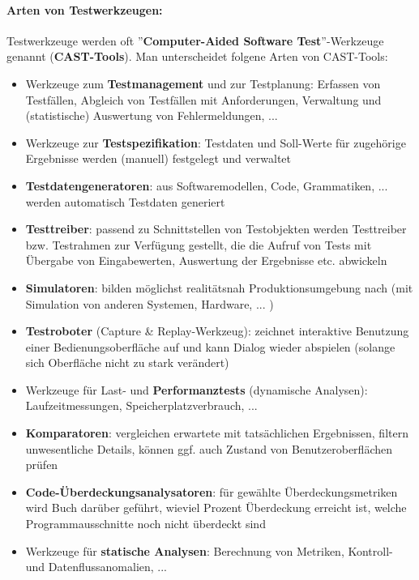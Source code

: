 \paragraph{Arten von Testwerkzeugen:}
Testwerkzeuge werden oft ''\textbf{Computer-Aided Software Test}''-Werkzeuge genannt (\textbf{CAST-Tools}). Man unterscheidet folgene Arten von CAST-Tools:
\begin{itemize}
	\item Werkzeuge zum \textbf{Testmanagement} und zur Testplanung: Erfassen von Testfällen, Abgleich von Testfällen mit Anforderungen, Verwaltung und (statistische) Auswertung von Fehlermeldungen, ...
	\item Werkzeuge zur \textbf{Testspezifikation}: Testdaten und Soll-Werte für zugehörige Ergebnisse werden (manuell) festgelegt und verwaltet
	\item \textbf{Testdatengeneratoren}: aus Softwaremodellen, Code, Grammatiken, ... werden automatisch Testdaten generiert
	\item \textbf{Testtreiber}: passend zu Schnittstellen von Testobjekten werden Testtreiber bzw. Testrahmen zur Verfügung gestellt, die die Aufruf von Tests mit Übergabe von Eingabewerten, Auswertung der Ergebnisse etc. abwickeln
	\item \textbf{Simulatoren}: bilden möglichst realitätsnah Produktionsumgebung nach (mit Simulation von anderen Systemen, Hardware, ... )
	\item \textbf{Testroboter} (Capture \& Replay-Werkzeug): zeichnet interaktive Benutzung einer Bedienungsoberfläche auf und kann Dialog wieder abspielen (solange sich Oberfläche nicht zu stark verändert)
	\item Werkzeuge für Last- und \textbf{Performanztests} (dynamische Analysen): Laufzeitmessungen, Speicherplatzverbrauch, ...
	\item \textbf{Komparatoren}: vergleichen erwartete mit tatsächlichen Ergebnissen, filtern unwesentliche Details, können ggf. auch Zustand von Benutzeroberflächen prüfen
	\item \textbf{Code-Überdeckungsanalysatoren}: für gewählte Überdeckungsmetriken wird Buch darüber geführt, wieviel Prozent Überdeckung erreicht ist, welche Programmausschnitte noch nicht überdeckt sind
	\item Werkzeuge für \textbf{statische Analysen}: Berechnung von Metriken, Kontroll- und Datenflussanomalien, ...
\end{itemize}

